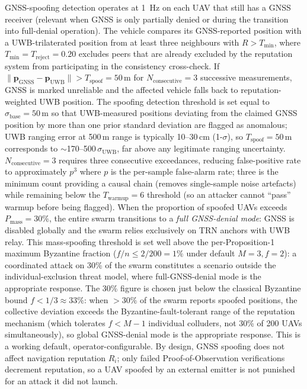 \documentclass[conference,10pt]{IEEEtran}
\begin{document}
GNSS-spoofing detection operates at 1~Hz on each UAV that still has a GNSS receiver (relevant when GNSS is only partially denied or during the transition into full-denial operation). The vehicle compares its GNSS-reported position with a UWB-trilaterated position from at least three neighbours with $R > T_\text{min}$, where $T_\text{min} = T_\text{reject} = 0.20$ excludes peers that are already excluded by the reputation system from participating in the consistency cross-check. If $\lVert \mathbf{p}_\text{GNSS} - \mathbf{p}_\text{UWB} \rVert > T_\text{spoof} = 50$\,m for $N_\text{consecutive} = 3$ successive measurements, GNSS is marked unreliable and the affected vehicle falls back to reputation-weighted UWB position. The spoofing detection threshold is set equal to $\sigma_\text{base}=50$\,m so that UWB-measured positions deviating from the claimed GNSS position by more than one prior standard deviation are flagged as anomalous; UWB ranging error at 500\,m range is typically 10--30\,cm (1-$\sigma$), so $T_\text{spoof}=50$\,m corresponds to $\sim$170--500$\,\sigma_\text{UWB}$, far above any legitimate ranging uncertainty. $N_\text{consecutive}=3$ requires three consecutive exceedances, reducing false-positive rate to approximately $p^3$ where $p$ is the per-sample false-alarm rate; three is the minimum count providing a causal chain (removes single-sample noise artefacts) while remaining below the $T_\text{warmup}=6$ threshold (so an attacker cannot ``pass'' warmup before being flagged). When the proportion of spoofed UAVs exceeds $P_\text{mass} = 30\%$, the entire swarm transitions to a \emph{full GNSS-denial mode}: GNSS is disabled globally and the swarm relies exclusively on TRN anchors with UWB relay. This mass-spoofing threshold is set well above the per-Proposition-1 maximum Byzantine fraction ($f/n \leq 2/200 = 1\%$ under default $M=3, f=2$): a coordinated attack on 30\% of the swarm constitutes a scenario outside the individual-exclusion threat model, where full-GNSS-denial mode is the appropriate response. The 30\% figure is chosen just below the classical Byzantine bound $f<1/3\approx 33\%$: when $>30\%$ of the swarm reports spoofed positions, the collective deviation exceeds the Byzantine-fault-tolerant range of the reputation mechanism (which tolerates $f<M-1$ individual colluders, not 30\% of 200 UAVs simultaneously), so global GNSS-denial mode is the appropriate response. This is a working default, operator-configurable. By design, GNSS spoofing does not affect navigation reputation $R_i$; only failed Proof-of-Observation verifications decrement reputation, so a UAV spoofed by an external emitter is not punished for an attack it did not launch.
\end{document}
